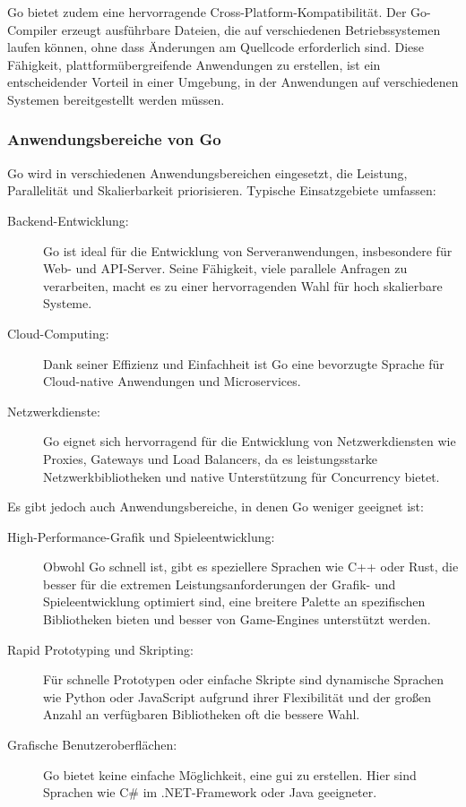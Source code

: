 Go bietet zudem eine hervorragende Cross-Platform-Kompatibilität. Der Go-Compiler erzeugt ausführbare Dateien, die auf verschiedenen Betriebssystemen laufen können, ohne dass Änderungen am Quellcode erforderlich sind. Diese Fähigkeit, plattformübergreifende Anwendungen zu erstellen, ist ein entscheidender Vorteil in einer Umgebung, in der Anwendungen auf verschiedenen Systemen bereitgestellt werden müssen. \cite{Pike}

\subsubsection{Anwendungsbereiche von Go}
Go wird in verschiedenen Anwendungsbereichen eingesetzt, die Leistung, Parallelität und Skalierbarkeit priorisieren. Typische Einsatzgebiete umfassen:
\begin{description}
    \item[Backend-Entwicklung:] Go ist ideal für die Entwicklung von Serveranwendungen, insbesondere für Web- und API-Server. Seine Fähigkeit, viele parallele Anfragen zu verarbeiten, macht es zu einer hervorragenden Wahl für hoch skalierbare Systeme.
    \item[Cloud-Computing:] Dank seiner Effizienz und Einfachheit ist Go eine bevorzugte Sprache für Cloud-native Anwendungen und Microservices.
    \item[Netzwerkdienste:] Go eignet sich hervorragend für die Entwicklung von Netzwerkdiensten wie Proxies, Gateways und Load Balancers, da es leistungsstarke Netzwerkbibliotheken und native Unterstützung für Concurrency bietet.
\end{description}

Es gibt jedoch auch Anwendungsbereiche, in denen Go weniger geeignet ist:
\begin{description}
    \item[High-Performance-Grafik und Spieleentwicklung:] Obwohl Go schnell ist, gibt es speziellere Sprachen wie C++ oder Rust, die besser für die extremen Leistungsanforderungen der Grafik- und Spieleentwicklung optimiert sind, eine breitere Palette an spezifischen Bibliotheken bieten und besser von Game-Engines unterstützt werden.
    \item[Rapid Prototyping und Skripting:] Für schnelle Prototypen oder einfache Skripte sind dynamische Sprachen wie Python oder JavaScript aufgrund ihrer Flexibilität und der großen Anzahl an verfügbaren Bibliotheken oft die bessere Wahl.
    \item[Grafische Benutzeroberflächen:] Go bietet keine einfache Möglichkeit, eine \ac{gui} zu erstellen. Hier sind Sprachen wie C\# im .NET-Frame\-work oder Java geeigneter.
\end{description}
\cite{Merrick2023}


